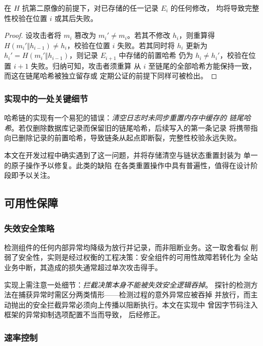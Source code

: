 \begin{proposition}[篡改可检测性]
在 $H$ 抗第二原像的前提下，对已存储的任一记录 $E_i$ 的任何修改，
均将导致完整性校验在位置 $i$ 或其后失败。
\end{proposition}

\begin{proof}
设攻击者将 $m_i$ 篡改为 $m_i' \neq m_i$。若其不修改 $h_i$，则重算得
$H(m_i' \Vert h_{i-1}) \neq h_i$，校验在位置 $i$ 失败。若其同时将 $h_i$
更新为 $h_i' = H(m_i' \Vert h_{i-1})$，则记录 $E_{i+1}$ 中存储的前置哈希
仍为 $h_i \neq h_i'$，校验在位置 $i+1$ 失败。归纳可知，攻击者须重算
从 $i$ 至链尾的全部哈希方能保持一致，而这在链尾哈希被独立留存或
定期公证的前提下同样可被检出。
\end{proof}

\subsubsection{实现中的一处关键细节}

哈希链的实现有一个易犯的错误：\emph{清空日志时未同步重置内存中缓存的
链尾哈希}。若仅删除数据库记录而保留旧的链尾哈希，后续写入的第一条记录
将携带指向已删除记录的前置哈希，导致链条从起点即断裂，完整性校验永远失败。

本文在开发过程中确实遇到了这一问题，并将存储清空与链状态重置封装为
单一的原子操作予以修复。此类的缺陷
在各类重置操作中具有普遍性，值得在设计阶段即予以关注。

\subsection{可用性保障}

\subsubsection{失效安全策略}

检测组件的任何内部异常均降级为放行并记录，而非阻断业务。这一取舍看似
削弱了安全性，实则是经过权衡的工程决策：安全组件的可用性故障若转化为
全站业务中断，其造成的损失通常超过单次攻击得手。

实现上需注意一处细节：\emph{拦截决策本身不能被失效安全逻辑吞掉}。
探针的检测方法在捕获异常时需区分两类情形——检测过程的意外异常应被吞掉
并放行，而主动抛出的安全拦截异常必须向上传播以阻断执行。本文在实现中
曾因字节码注入框架的异常抑制选项配置不当而导致，
后经修正。

\subsubsection{速率控制}

